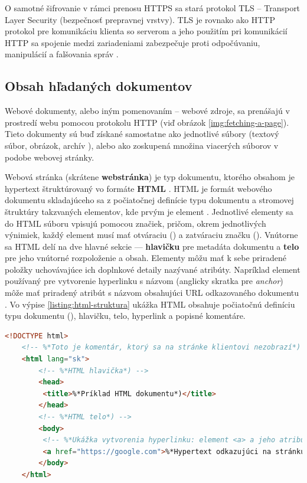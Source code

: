 O samotné šifrovanie v rámci prenosu HTTPS sa stará protokol TLS -- Transport Layer Security (bezpečnosť prepravnej vrstvy).
TLS je rovnako ako HTTP protokol pre komunikáciu klienta so serverom a jeho použitím pri komunikácií HTTP sa spojenie medzi zariadeniami zabezpečuje proti odpočúvaniu, manipulácií a falšovania správ \cite{cloudflare-tls}. 


\subsection{Obsah hľadaných dokumentov}
\label{obsah-hladanych-dokumentov}

Webové dokumenty, alebo iným pomenovaním -- webové zdroje, sa prenášajú v prostredí webu pomocou protokolu HTTP  (viď obrázok \ref{img:fetching-a-page}).
Tieto dokumenty sú buď získané samostatne ako jednotlivé súbory (textový súbor, obrázok, archív ), alebo ako zoskupená množina viacerých súborov v podobe webovej stránky.

Webová stránka (skrátene \textbf{webstránka}) je typ dokumentu, ktorého obsahom je hypertext štruktúrovaný vo formáte \textbf{HTML} \cite{documents-webpage}.
HTML je formát webového dokumentu skladajúceho sa z počiatočnej definície typu dokumentu a stromovej štruktúry takzvaných elementov, kde prvým je element . 
Jednotlivé elementy sa do HTML súboru vpisujú pomocou značiek, pričom, okrem jednotlivých výnimiek, 
každý element musí mať otváraciu () a zatváraciu značku ().
Vnútorne sa HTML delí na dve hlavné sekcie --- \textbf{hlavičku} pre metadáta dokumentu a \textbf{telo} pre jeho vnútorné rozpoloženie a obsah.
Elementy môžu mať k sebe priradené položky uchovávajúce ich doplnkové detaily nazývané atribúty. 
Napríklad element používaný pre vytvorenie hyperlinku s názvom  (anglicky skratka pre \textit{anchor}) 
môže mať priradený atribút s názvom  obsahujúci URL odkazovaného dokumentu \cite{documents-html-spec}. 
Vo výpise \ref{listing:html-struktura} ukážka HTML obsahuje počiatočnú definíciu typu dokumentu (), hlavičku, telo, hyperlink a popisné komentáre.


\begin{center}
\centering
\begin{lstlisting}[caption={Príklad základnej štruktúry obsahu HTML dokumentu.},
label=listing:html-struktura, 
language=HTML, 
frame=tb,
xleftmargin=.05\textwidth, 
xrightmargin=.05\textwidth]
    <!DOCTYPE html>
    <!-- %*Toto je komentár, ktorý sa na stránke klientovi nezobrazí*) -->
    <html lang="sk">       
        <!-- %*HTML hlavička*) -->
        <head>
         <title>%*Príklad HTML dokumentu*)</title>
        </head>
        <!-- %*HTML telo*) -->
        <body>
         <!-- %*Ukážka vytvorenia hyperlinku: element <a> a jeho atribút href*) -->
         <a href="https://google.com">%*Hypertext odkazujúci na stránku google*)</a>
        </body>
    </html>
\end{lstlisting}
\end{center}

